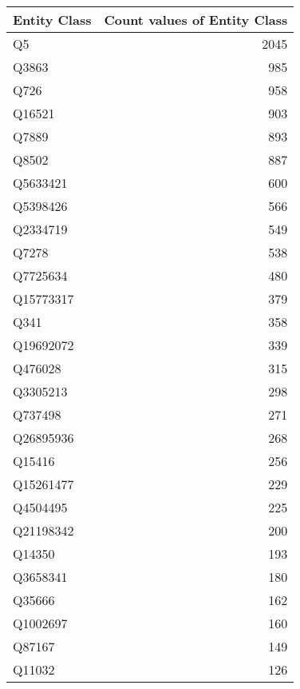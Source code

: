 \begin{tabular}{lr}
\toprule
Entity Class &  Count values of Entity Class \\
\midrule
          Q5 &                          2045 \\
       Q3863 &                           985 \\
        Q726 &                           958 \\
      Q16521 &                           903 \\
       Q7889 &                           893 \\
       Q8502 &                           887 \\
    Q5633421 &                           600 \\
    Q5398426 &                           566 \\
    Q2334719 &                           549 \\
       Q7278 &                           538 \\
    Q7725634 &                           480 \\
   Q15773317 &                           379 \\
        Q341 &                           358 \\
   Q19692072 &                           339 \\
     Q476028 &                           315 \\
    Q3305213 &                           298 \\
     Q737498 &                           271 \\
   Q26895936 &                           268 \\
      Q15416 &                           256 \\
   Q15261477 &                           229 \\
    Q4504495 &                           225 \\
   Q21198342 &                           200 \\
      Q14350 &                           193 \\
    Q3658341 &                           180 \\
      Q35666 &                           162 \\
    Q1002697 &                           160 \\
      Q87167 &                           149 \\
      Q11032 &                           126 \\

\end{tabular}
